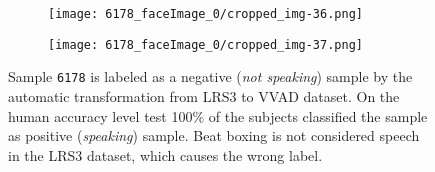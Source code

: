 \begin{figure}
{\begin{subfigure}{0.09\textwidth}
\end{subfigure}
\begin{subfigure}{0.09\textwidth}
  \centering
  \texttt{[image: 6178\_faceImage\_0/cropped\_img-36.png]}
\end{subfigure}
\begin{subfigure}{0.09\textwidth}
  \centering
  \texttt{[image: 6178\_faceImage\_0/cropped\_img-37.png]}
\end{subfigure}
}
\caption{Sample \texttt{6178} is labeled as a negative (\emph{not speaking}) sample by the automatic transformation from LRS3 to VVAD dataset. On the human accuracy level test 100\% of the subjects classified the sample as positive (\emph{speaking}) sample. Beat boxing is not considered speech in the LRS3 dataset, which causes the wrong label.}
\label{fig:6178}
\end{figure}


